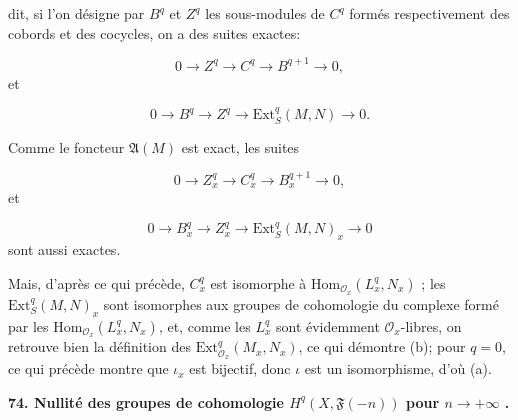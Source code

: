 %
%
%
dit, si l'on désigne par $B^q$ et $Z^q$ les sous-modules de $C^q$ formés respectivement des cobords et des cocycles, on a des suites exactes:

\begin{equation*}
0 \rightarrow Z^q \rightarrow C^q \rightarrow B^{q+1} \rightarrow 0,
\end{equation*}
et

\begin{equation*}
0 \rightarrow B^q \rightarrow Z^q \rightarrow \mathrm{Ext}_S^q(M, N) \rightarrow 0.
\end{equation*}

Comme le foncteur $\mathfrak{A}(M)$ est exact, les suites

\begin{equation*}
0 \rightarrow Z_x^q \rightarrow C_x^q \rightarrow B_x^{q+1} \rightarrow 0,
\end{equation*}
et

\begin{equation*}
0 \rightarrow B_x^q \rightarrow Z_x^q \rightarrow \mathrm{Ext}_S^q(M, N)_x \rightarrow 0
\end{equation*}
sont aussi exactes.

Mais, d'après ce qui précède, $C_x^q$ est isomorphe à $\mathrm{Hom}_{\mathcal{O}_x}(L_x^q , N_x)$ ; les $\mathrm{Ext}_S^q(M, N)_x$ sont isomorphes aux groupes de cohomologie du complexe formé par les $\mathrm{Hom}_{\mathcal{O}_x}(L_x^q , N_x)$, et, comme les $L_x^q$ sont évidemment $\mathcal{O}_x$-libres, on retrouve bien la définition des $\mathrm{Ext}_{\mathcal{O}_x}^q(M_x , N_x)$, ce qui démontre (b); pour $q = 0$, ce qui précède montre que $\iota_x$ est bijectif, donc $\iota$ est un isomorphisme, d'où (a).

\textbf{74. Nullité des groupes de cohomologie $H^q(X, \mathfrak{F}(-n))$ pour $n \rightarrow +\infty$ .}

